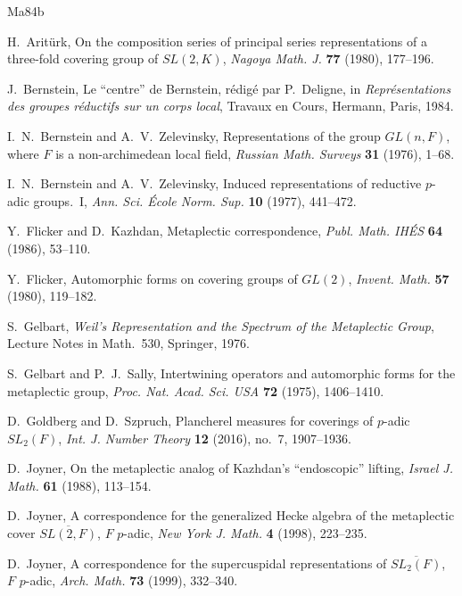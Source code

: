 \documentclass[12pt,letterpaper]{article}
\numberwithin{equation}{section}
\theoremstyle{plain}
\theoremstyle{definition}
\theoremstyle{remark}
\begin{document}
\begin{thebibliography}{Ma84b}

 H.~Arit\"urk, On the composition series of
principal series representations of a three-fold covering group of
$SL(2,K)$, \emph{Nagoya Math. J.} \textbf{77} (1980), 177--196.

 J.~Bernstein, Le ``centre'' de Bernstein,
r\'edig\'e par P.~Deligne, in \emph{Repr\'esentations des groupes
r\'eductifs sur un corps local}, Travaux en Cours, Hermann, Paris,
1984.

 I.~N.~Bernstein and A.~V.~Zelevinsky,
Representations of the group $GL(n,F)$, where $F$ is a
non-archimedean local field, \emph{Russian Math. Surveys}
\textbf{31} (1976), 1--68.

 I.~N.~Bernstein and A.~V.~Zelevinsky, Induced
representations of reductive $p$-adic groups.~I, \emph{Ann. Sci.
\'Ecole Norm. Sup.} \textbf{10} (1977), 441--472.

 Y.~Flicker and D.~Kazhdan, Metaplectic
correspondence, \emph{Publ. Math. IH\'ES} \textbf{64} (1986), 53--110.

 Y.~Flicker, Automorphic forms on covering groups
of $GL(2)$, \emph{Invent. Math.} \textbf{57} (1980), 119--182.

 S.~Gelbart, \emph{Weil's Representation and the
Spectrum of the Metaplectic Group}, Lecture Notes in Math.~530,
Springer, 1976.

 S.~Gelbart and P.~J.~Sally, Intertwining operators
and automorphic forms for the metaplectic group, \emph{Proc. Nat.
Acad. Sci. USA} \textbf{72} (1975), 1406--1410.

 D.~Goldberg and D.~Szpruch, Plancherel measures
for coverings of $p$-adic $SL_2(F)$, \emph{Int. J. Number Theory}
\textbf{12} (2016), no.~7, 1907--1936.

 D.~Joyner, On the metaplectic analog of Kazhdan's
``endoscopic'' lifting, \emph{Israel J. Math.} \textbf{61} (1988),
113--154.

 D.~Joyner, A correspondence for the generalized
Hecke algebra of the metaplectic cover $\overline{SL(2,F)}$, $F$
$p$-adic, \emph{New York J. Math.} \textbf{4} (1998), 223--235.

 D.~Joyner, A correspondence for the supercuspidal
representations of $\overline{SL_2(F)}$, $F$ $p$-adic, \emph{Arch.
Math.} \textbf{73} (1999), 332--340.


\end{thebibliography}
\end{document}
